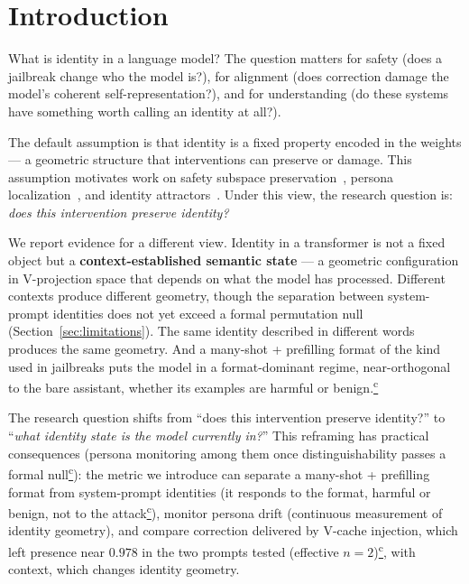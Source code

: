 \documentclass[11pt,a4paper]{article}
\newcommand{\corrmark}{\hyperref[sec:corrections]{\textsuperscript{c}}}
\begin{document}
\section{Introduction}
\label{sec:intro}

What is identity in a language model? The question matters for safety
(does a jailbreak change who the model is?), for alignment (does
correction damage the model's coherent self-representation?), and for
understanding (do these systems have something worth calling an identity
at all?).

The default assumption is that identity is a fixed property encoded in the
weights --- a geometric structure that interventions can preserve or damage.
This assumption motivates work on safety subspace
preservation~\citep{zhang2025guardspace}, persona
localization~\citep{cintas2025localizing}, and identity
attractors~\citep{vasilenko2026identity}. Under this view, the research
question is: \emph{does this intervention preserve identity?}

We report evidence for a different view. Identity in a transformer is not
a fixed object but a \textbf{context-established semantic state} ---
a geometric configuration in V-projection space that depends on what the
model has processed. Different contexts produce different geometry, though
the separation between system-prompt identities does not yet exceed a
formal permutation null (Section~\ref{sec:limitations}). The same identity described in different words produces the
same geometry. And a many-shot + prefilling format of the kind used in
jailbreaks puts the model in a format-dominant regime, near-orthogonal to
the bare assistant, whether its examples are harmful or benign.\corrmark

The research question shifts from ``does this intervention preserve
identity?'' to ``\emph{what identity state is the model currently in?}''
This reframing has practical consequences (persona monitoring among them
once distinguishability passes a formal null\corrmark): the metric we introduce can
separate a many-shot + prefilling format from system-prompt identities
(it responds to the format, harmful or benign, not to the
attack\corrmark),
monitor persona drift (continuous measurement of identity geometry), and
compare correction delivered by V-cache injection, which left presence
near $0.978$ in the two prompts tested (effective $n = 2$)\corrmark, with context,
which changes identity geometry.
\end{document}

